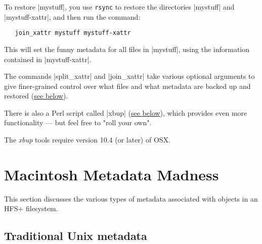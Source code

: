 \documentclass[11pt]{article}
\begin{document}
To restore |mystuff|, you use \texttt{rsync} to restore the directories |mystuff| and
|mystuff-xattr|, and then run the command:
\begin{Verbatim}
   join_xattr mystuff mystuff-xattr
\end{Verbatim}
This will set the funny metadata for all files in |mystuff|, using the
information contained in |mystuff-xattr|.

The commands |split_xattr| and |join_xattr| take
various optional arguments to give finer-grained control
over what files and what metadata are backed up and restored 
(\hyperlink{split-command}{see below}).

There is also a Perl script called |xbup| 
(\hyperlink{xbup-command}{see below}), which provides even more
functionality --- but feel free to "roll your own".

The \emph{xbup} tools require version 10.4 (or later) of OSX.

\section{Macintosh Metadata Madness}

This section discusses the various types of metadata associated
with objects in an HFS+ filesystem.


\subsection{Traditional Unix metadata}
\end{document}
